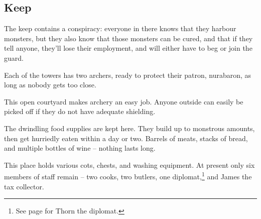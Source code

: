 \subsection{ Keep}

The keep contains a conspiracy: everyone in there knows that they harbour monsters, but they also know that those monsters can be cured, and that if they tell anyone, they'll lose their employment, and will either have to beg or join the \gls{guard}.


Each of the towers has two archers, ready to protect their patron, \gls{nurabaron}, as long as nobody gets too close.





This open courtyard makes archery an easy job.  Anyone outside can easily be picked off if they do not have adequate shielding.


The dwindling food supplies are kept here.  They build up to monstrous amounts, then get hurriedly eaten within a day or two.  Barrels of meats, stacks of bread, and multiple bottles of wine -- nothing lasts long.


This place holds various cots, chests, and washing equipment.  At present only six members of staff remain -- two cooks, two butlers, one diplomat,\footnote{See page \pageref{thorn} for Thorn the diplomat.} and James the tax collector.


